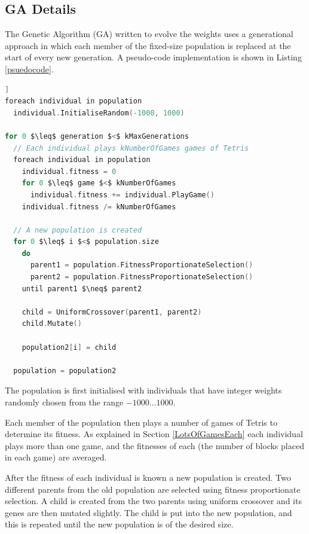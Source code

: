 \documentclass[a4paper,12pt]{article}
\begin{document}
\subsection{GA Details}

The Genetic Algorithm (GA) written to evolve the weights uses a generational
approach in which each member of the fixed-size population is replaced at the
start of every new generation.
A pseudo-code implementation is shown in Listing \ref{psuedocode}.

\begin{lstlisting}[firstnumber=1,language=c,morekeywords={until,foreach,in},frame=single,mathescape=true,caption={GA pseudo-code},label={psuedocode},float=[htb]]
foreach individual in population
  individual.InitialiseRandom(-1000, 1000)

for 0 $\leq$ generation $<$ kMaxGenerations
  // Each individual plays kNumberOfGames games of Tetris
  foreach individual in population
    individual.fitness = 0
    for 0 $\leq$ game $<$ kNumberOfGames
      individual.fitness += individual.PlayGame()
    individual.fitness /= kNumberOfGames
  
  // A new population is created
  for 0 $\leq$ i $<$ population.size
    do
      parent1 = population.FitnessProportionateSelection()
      parent2 = population.FitnessProportionateSelection()
    until parent1 $\neq$ parent2
    
    child = UniformCrossover(parent1, parent2)
    child.Mutate()
    
    population2[i] = child
    
  population = population2
\end{lstlisting}

The population is first initialised with individuals that have integer weights
randomly chosen from the range $-1000 \ldots 1000$.

Each member of the population then plays a number of games of Tetris to
determine its fitness.
As explained in Section \ref{LotsOfGamesEach} each individual plays more than
one game, and the fitnesses of each (the number of blocks placed in each game)
are averaged.

After the fitness of each individual is known a new population is created.
Two different parents from the old population are selected using fitness
proportionate selection.
A child is created from the two parents using uniform crossover and its genes
are then mutated slightly.
The child is put into the new population, and this is repeated until the new
population is of the desired size.
\end{document}
